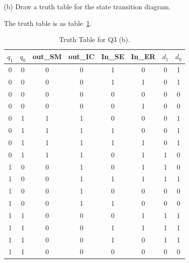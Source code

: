 \documentclass{article}
\theoremstyle{remark}
\theoremstyle{definition}
\begin{document}
\begin{enumerate}
        \item[(b)] Draw a truth table for the state transition diagram.

        The truth table is as table~\ref{tab:Q3btruth_table}.
        \begin{table}
            \centering
            \begin{tabular}{cccccccc}
                \toprule
                $q_1$ & $q_0$ & out\_SM & out\_IC & In\_SE & In\_ER & $d_1$ & $d_0$ \\
                \midrule
                0     & 0     & 0       & 0       & 1      & 0      & 0     & 1     \\
                0     & 0     & 0       & 0       & 1      & 1      & 0     & 1     \\
                0     & 0     & 0       & 0       & 0      & 0      & 0     & 0     \\
                0     & 0     & 0       & 0       & 0      & 1      & 0     & 0     \\
                \midrule
                0     & 1     & 1       & 1       & 0      & 0      & 0     & 1     \\
                0     & 1     & 1       & 1       & 1      & 0      & 0     & 1     \\
                0     & 1     & 1       & 1       & 1      & 1      & 0     & 1     \\
                0     & 1     & 1       & 1       & 0      & 1      & 1     & 0     \\
                \midrule
                1     & 0     & 0       & 1       & 0      & 1      & 1     & 0     \\
                1     & 0     & 0       & 1       & 1      & 1      & 1     & 1     \\
                1     & 0     & 0       & 1       & 0      & 0      & 0     & 0     \\
                1     & 0     & 0       & 1       & 1      & 0      & 0     & 0     \\
                \midrule
                1     & 1     & 0       & 0       & 0      & 1      & 1     & 1     \\
                1     & 1     & 0       & 0       & 1      & 1      & 1     & 1     \\
                1     & 1     & 0       & 0       & 1      & 0      & 1     & 1     \\
                1     & 1     & 0       & 0       & 0      & 0      & 0     & 0     \\
                \bottomrule
            \end{tabular}
            \caption{Truth Table for Q3 (b).}
            \label{tab:Q3btruth_table}
        \end{table}


\end{enumerate}
\end{document}
